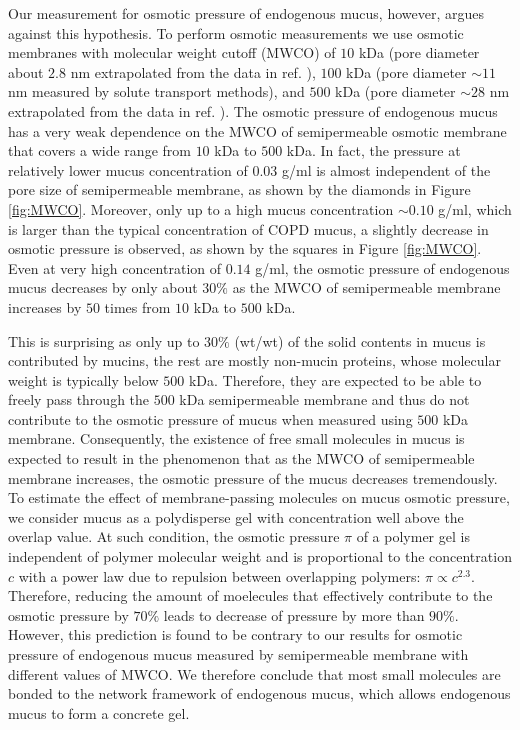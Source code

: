 \documentclass[8.5pt,twoside,twocolumn]{article}
\begin{document}
Our measurement for osmotic pressure of endogenous mucus, however, argues
against this hypothesis. To perform osmotic measurements we use osmotic
membranes with molecular weight cutoff (MWCO) of $10$ kDa (pore diameter
about $2.8$ nm extrapolated from the data in ref. ), $100$
kDa (pore diameter $\sim 11$ nm measured by solute transport methods\cite%
{Singh1998}), and $500$ kDa (pore diameter $\sim 28$ nm extrapolated from
the data in ref. ). The osmotic pressure of endogenous
mucus has a very weak dependence on the MWCO of semipermeable osmotic
membrane that covers a wide range from $10$ kDa to $500$ kDa. In fact, the
pressure at relatively lower mucus concentration of $0.03$ g/ml is almost
independent of the pore size of semipermeable membrane, as shown by the
diamonds in Figure \ref{fig:MWCO}. Moreover, only up to a high mucus
concentration $\sim 0.10$ g/ml, which is larger than the typical
concentration of COPD mucus, a slightly decrease in osmotic pressure is
observed, as shown by the squares in Figure \ref{fig:MWCO}. Even at very
high concentration of $0.14$ g/ml, the osmotic pressure of endogenous mucus
decreases by only about $30\%$ as the MWCO of semipermeable membrane
increases by $50$ times from $10$ kDa to $500$ kDa.

This is surprising as only up to $30\%$ (wt/wt) of the solid contents in
mucus is contributed by mucins, the rest are mostly non-mucin proteins,
whose molecular weight is typically below $500$ kDa\cite{Rose1992,
Thornton2008, Fahy2010}. Therefore, they are expected to be able to freely
pass through the $500$ kDa semipermeable membrane and thus do not contribute
to the osmotic pressure of mucus when measured using $500$ kDa membrane.
Consequently, the existence of free small molecules in mucus is expected to
result in the phenomenon that as the MWCO of semipermeable membrane
increases, the osmotic pressure of the mucus decreases tremendously. To
estimate the effect of membrane-passing molecules on mucus osmotic pressure,
we consider mucus as a polydisperse gel with concentration well above the
overlap value. At such condition, the osmotic pressure $\pi $ of a polymer
gel is independent of polymer molecular weight and is proportional to the
concentration $c$ with a power law due to repulsion between overlapping
polymers: $\pi \propto c^{2.3}$.\cite{Rubinstein2003} Therefore, reducing
the amount of moelecules that effectively contribute to the osmotic pressure
by $70\%$ leads to decrease of pressure by more than $90\%$. However, this
prediction is found to be contrary to our results for osmotic pressure of
endogenous mucus measured by semipermeable membrane with different values of
MWCO. We therefore conclude that most small molecules are bonded to the
network framework of endogenous mucus, which allows endogenous mucus to form
a concrete gel.
\end{document}
